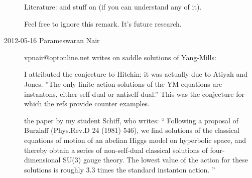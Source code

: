 \begin{description}
Literature:  and stuff on
 (if you can understand any of it).

Feel free to ignore this remark. It's future research.

\item[2012-05-16  Parameswaran Nair]  vpnair@optonline.net writes
on saddle solutions of Yang-Mills:

I attributed the conjecture to Hitchin; it was actually due to Atiyah and
Jones. ''The only finite action solutions of the YM equations are
instantons, either self-dual or antiself-dual.'' This was the conjecture
for which the refs provide counter examples.

 the paper by my
student Schiff, who writes:
``
Following a proposal of Burzlaff (Phys.Rev.D 24 (1981) 546), we find
solutions of the classical equations of motion of an abelian Higgs model
on hyperbolic space, and thereby obtain a series of non-self-dual
classical solutions of four-dimensional SU(3) gauge theory. The lowest
value of the action for these solutions is roughly 3.3 times the standard
instanton action.
''


\end{description}
